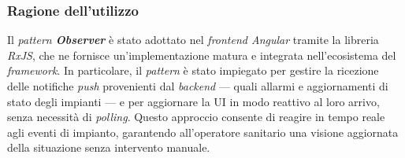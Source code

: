\subsubsection{Ragione dell'utilizzo}
Il \textit{pattern \textbf{Observer}} è stato adottato nel \textit{frontend Angular} tramite la libreria 
\textit{RxJS}, che ne fornisce un'implementazione matura e integrata nell'ecosistema del 
\textit{framework}. In particolare, il \textit{pattern} è stato impiegato per gestire la ricezione 
delle notifiche \textit{push} provenienti dal \textit{backend} — quali allarmi e aggiornamenti 
di stato degli impianti — e per aggiornare la UI in modo reattivo al loro arrivo, senza 
necessità di \textit{polling}. Questo approccio consente di reagire in tempo reale agli eventi di impianto, garantendo all'operatore sanitario 
una visione aggiornata della situazione senza intervento manuale.